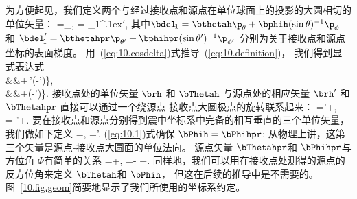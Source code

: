 为方便起见，我们定义两个与经过接收点和源点在单位球面上的投影的大圆相切的单位矢量：
\eq
\bThetah=\bdel_{}\Theta,\qquad
\bThetahpr=-\bdel_{\!\rm 1}^{\raise.1ex\hbox{$\scriptstyle\prime$}}\Theta,
\label{eq:10.definition}
\en
其中$\bdel_{\!1}=\bthetah\p_{\theta}+\bphih(\sin\theta)^{-1}
\p_{\phi}$ 和 $\bdel_{\!1}^{\raise.1ex\hbox{$\scriptstyle\prime$}}=\bthetahpr\p_{\theta'}+\bphihpr(\sin\theta')^{-1}\p_{\phi'}$ 分别为关于接收点和源点坐标的表面梯度。
%
%
用~(\ref{eq:10.cosdelta})式推导~(\ref{eq:10.definition})，
我们得到显式表达式
\eqa
{}
\nonumber \\
&&\mbox{}\qquad\qquad\qquad+\bphih\,\sin\theta'\sin(\phi-\phi')\},
\label{eq:10.bdh}
\ena
\eqa
{}
\nonumber \\
&&\mbox{}\qquad\qquad\qquad+\bphihpr\sin\theta\sin(\phi-\phi')\}.
\label{eq:10.bdhs}
\ena
接收点处的单位矢量 $\brh$ 和 $\bThetah$ 与源点处的相应矢量 $\brh'$ 和 $\bThetahpr$
直接可以通过一个绕源点-接收点大圆极点的旋转联系起来：
\eq \label{eq:10.1}
\brh=\brh'\cos\Theta+\bThetahpr\sin\Theta,\qquad
\bThetah=-\brh'\sin\Theta+\bThetahpr\cos\Theta.
\en
要在接收点和源点分别得到震中坐标系中完备的相互垂直的三个单位矢量，
我们做如下定义
\eq
\label{eq:10.defn2}
\bPhih=\brh\times\bThetah,\qquad
\bPhihpr=\brh'\times\bThetahpr.
\en
(\ref{eq:10.1})式确保 $\bPhih=\bPhihpr$; 从物理上讲，这第三个矢量是源点-接收点大圆面的单位法向。
源点矢量 $\bThetahpr$和 $\bPhihpr$与方位角 $\Phi$有简单的关系
\eq \label{eq:10.Phi}
\bThetahpr=\bthetahpr\cos\Phi+\bphihpr\sin\Phi,
\qquad\bPhihpr=-\bthetahpr\sin\Phi
+\bphihpr\cos\Phi.
\en
同样地，我们可以用在接收点处测得的源点的反方位角来定义 $\bThetah$和 $\bPhih$， 但这在后续的推导中是不需要的。
图~\ref{10.fig.geom}简要地显示了我们所使用的坐标系约定。


